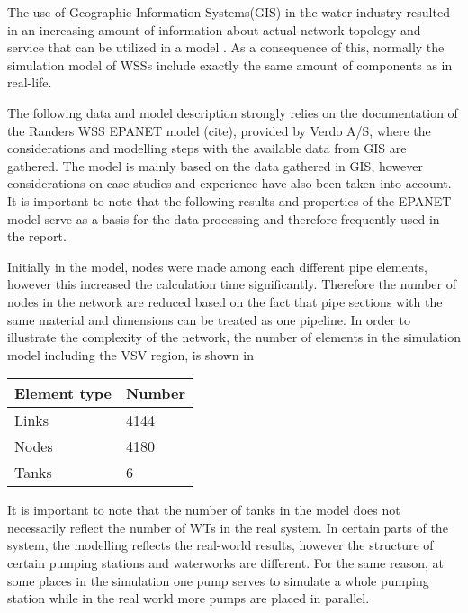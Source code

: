 The use of Geographic Information Systems(GIS) in the water industry resulted in an increasing amount of information about actual network topology and service that can be utilized in a model \cite{johnson2016geographic}. As a consequence of this, normally the simulation model of WSSs include exactly the same amount of components as in real-life. 

The following data and model description strongly relies on the documentation of the Randers WSS EPANET model (cite), provided by Verdo A/S, where the considerations and modelling steps with the available data from GIS are gathered. The model is mainly based on the data gathered in GIS, however considerations on case studies and experience have also been taken into account. It is important to note that the following results and properties of the EPANET model serve as a basis for the data processing and therefore frequently used in the report.  

Initially in the model, nodes were made among each different pipe elements, however this increased the calculation time significantly. Therefore the number of nodes in the network are reduced based on the fact that pipe sections with the same material and dimensions can be treated as one pipeline. In order to illustrate the complexity of the network, the number of elements in the simulation model including the VSV region, is shown in 

\begin{center}
\label{numberofelements_table}
    \begin{tabular}{ | p{3cm} | p{3cm} |}
    \hline
    \textbf{Element type} & \textbf{Number}  \\ 
    \hline
    Links & 4144  \\ 
    \hline
    Nodes & 4180  \\ 
    \hline
    Tanks & 6  \\ 
    \hline
    \end{tabular}
\end{center}

It is important to note that the number of tanks in the model does not necessarily reflect the number of WTs in the real system. In certain parts of the system, the modelling reflects the real-world results, however the structure of certain pumping stations and waterworks are different. For the same reason, at some places in the simulation one pump serves to simulate a whole pumping station while in the real world more pumps are placed in parallel. 

